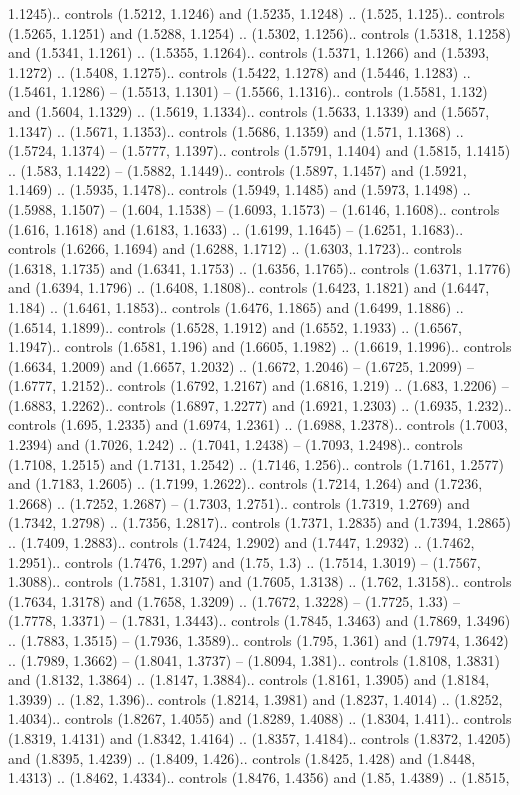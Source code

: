 1.1245).. controls (1.5212, 1.1246) and (1.5235, 1.1248) .. (1.525, 1.125).. controls (1.5265, 1.1251) and (1.5288, 1.1254) .. (1.5302, 1.1256).. controls (1.5318, 1.1258) and (1.5341, 1.1261) .. (1.5355, 1.1264).. controls (1.5371, 1.1266) and (1.5393, 1.1272) .. (1.5408, 1.1275).. controls (1.5422, 1.1278) and (1.5446, 1.1283) .. (1.5461, 1.1286) -- (1.5513, 1.1301) -- (1.5566, 1.1316).. controls (1.5581, 1.132) and (1.5604, 1.1329) .. (1.5619, 1.1334).. controls (1.5633, 1.1339) and (1.5657, 1.1347) .. (1.5671, 1.1353).. controls (1.5686, 1.1359) and (1.571, 1.1368) .. (1.5724, 1.1374) -- (1.5777, 1.1397).. controls (1.5791, 1.1404) and (1.5815, 1.1415) .. (1.583, 1.1422) -- (1.5882, 1.1449).. controls (1.5897, 1.1457) and (1.5921, 1.1469) .. (1.5935, 1.1478).. controls (1.5949, 1.1485) and (1.5973, 1.1498) .. (1.5988, 1.1507) -- (1.604, 1.1538) -- (1.6093, 1.1573) -- (1.6146, 1.1608).. controls (1.616, 1.1618) and (1.6183, 1.1633) .. (1.6199, 1.1645) -- (1.6251, 1.1683).. controls (1.6266, 1.1694) and (1.6288, 1.1712) .. (1.6303, 1.1723).. controls (1.6318, 1.1735) and (1.6341, 1.1753) .. (1.6356, 1.1765).. controls (1.6371, 1.1776) and (1.6394, 1.1796) .. (1.6408, 1.1808).. controls (1.6423, 1.1821) and (1.6447, 1.184) .. (1.6461, 1.1853).. controls (1.6476, 1.1865) and (1.6499, 1.1886) .. (1.6514, 1.1899).. controls (1.6528, 1.1912) and (1.6552, 1.1933) .. (1.6567, 1.1947).. controls (1.6581, 1.196) and (1.6605, 1.1982) .. (1.6619, 1.1996).. controls (1.6634, 1.2009) and (1.6657, 1.2032) .. (1.6672, 1.2046) -- (1.6725, 1.2099) -- (1.6777, 1.2152).. controls (1.6792, 1.2167) and (1.6816, 1.219) .. (1.683, 1.2206) -- (1.6883, 1.2262).. controls (1.6897, 1.2277) and (1.6921, 1.2303) .. (1.6935, 1.232).. controls (1.695, 1.2335) and (1.6974, 1.2361) .. (1.6988, 1.2378).. controls (1.7003, 1.2394) and (1.7026, 1.242) .. (1.7041, 1.2438) -- (1.7093, 1.2498).. controls (1.7108, 1.2515) and (1.7131, 1.2542) .. (1.7146, 1.256).. controls (1.7161, 1.2577) and (1.7183, 1.2605) .. (1.7199, 1.2622).. controls (1.7214, 1.264) and (1.7236, 1.2668) .. (1.7252, 1.2687) -- (1.7303, 1.2751).. controls (1.7319, 1.2769) and (1.7342, 1.2798) .. (1.7356, 1.2817).. controls (1.7371, 1.2835) and (1.7394, 1.2865) .. (1.7409, 1.2883).. controls (1.7424, 1.2902) and (1.7447, 1.2932) .. (1.7462, 1.2951).. controls (1.7476, 1.297) and (1.75, 1.3) .. (1.7514, 1.3019) -- (1.7567, 1.3088).. controls (1.7581, 1.3107) and (1.7605, 1.3138) .. (1.762, 1.3158).. controls (1.7634, 1.3178) and (1.7658, 1.3209) .. (1.7672, 1.3228) -- (1.7725, 1.33) -- (1.7778, 1.3371) -- (1.7831, 1.3443).. controls (1.7845, 1.3463) and (1.7869, 1.3496) .. (1.7883, 1.3515) -- (1.7936, 1.3589).. controls (1.795, 1.361) and (1.7974, 1.3642) .. (1.7989, 1.3662) -- (1.8041, 1.3737) -- (1.8094, 1.381).. controls (1.8108, 1.3831) and (1.8132, 1.3864) .. (1.8147, 1.3884).. controls (1.8161, 1.3905) and (1.8184, 1.3939) .. (1.82, 1.396).. controls (1.8214, 1.3981) and (1.8237, 1.4014) .. (1.8252, 1.4034).. controls (1.8267, 1.4055) and (1.8289, 1.4088) .. (1.8304, 1.411).. controls (1.8319, 1.4131) and (1.8342, 1.4164) .. (1.8357, 1.4184).. controls (1.8372, 1.4205) and (1.8395, 1.4239) .. (1.8409, 1.426).. controls (1.8425, 1.428) and (1.8448, 1.4313) .. (1.8462, 1.4334).. controls (1.8476, 1.4356) and (1.85, 1.4389) .. (1.8515, 